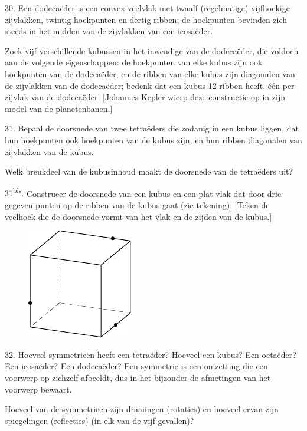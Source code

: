 \begin{problem}{30.}
	Een dodecaëder is een convex veelvlak met twaalf (regelmatige) vijfhoekige zijvlakken, twintig hoekpunten en dertig ribben; de hoek\-punten bevinden zich steeds in het midden van de zijvlakken van een icosaëder.

	Zoek vijf verschillende kubussen in het inwendige van de dodecaë\-der, die voldoen aan de volgende eigenschappen: de hoekpunten van elke kubus zijn ook hoekpunten van de dodecaëder, en de ribben van elke kubus zijn diagonalen van de zijvlakken van de dodecaë\-der; bedenk dat een kubus 12 ribben heeft, één per zijvlak van de dodecaëder. [Johannes Kepler wierp deze constructie op in zijn model van de planetenbanen.]
\end{problem}

\begin{problem}{31.}
	Bepaal de doorsnede van twee tetraëders die zodanig in een kubus liggen, dat hun hoekpunten ook hoekpunten van de kubus zijn, en hun ribben diagonalen van zijvlakken van de kubus.

	Welk breukdeel van de kubusinhoud maakt de doorsnede van de tetraëders uit?
\end{problem}

\begin{problem}{31\textsuperscript{bis}.}
	Construeer de doorsnede van een kubus en een plat vlak dat door drie gegeven punten op de ribben van de kubus gaat (zie teke\-ning). [Teken de veelhoek die de doorsnede vormt van het vlak en de zijden van de kubus.]
	\begin{figure}
		\includegraphics{resources/taskbook-15}
	\end{figure}
\end{problem}

\begin{problem}{32.}
	Hoeveel symmetrieën heeft een tetraëder? Hoeveel een kubus? Een octaëder? Een icosaëder? Een dodecaëder? Een symmetrie is een omzetting die een voorwerp op zichzelf afbeeldt, dus in het bijzonder de afmetingen van het voorwerp bewaart.

	Hoeveel van de symmetrieën zijn draaiingen (rotaties) en hoeveel ervan zijn spiegelingen (reflecties) (in elk van de vijf gevallen)?
\end{problem}

